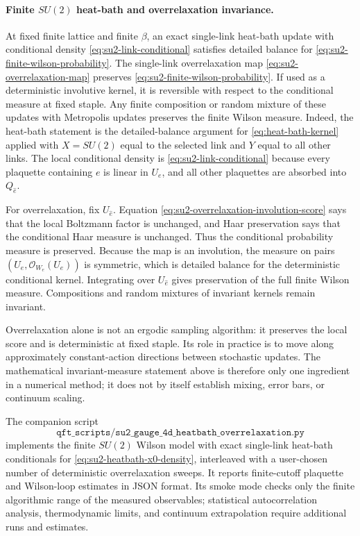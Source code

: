 \paragraph{Finite \(SU(2)\) heat-bath and overrelaxation invariance.}
At fixed finite lattice and finite \(\beta\), an exact single-link heat-bath
update with conditional density \eqref{eq:su2-link-conditional} satisfies
detailed balance for \eqref{eq:su2-finite-wilson-probability}.  The
single-link overrelaxation map \eqref{eq:su2-overrelaxation-map} preserves
\eqref{eq:su2-finite-wilson-probability}.  If used as a deterministic
involutive kernel, it is reversible with respect to the conditional measure
at fixed staple.  Any finite composition or random mixture of these updates
with Metropolis updates preserves the finite Wilson measure.  Indeed, the
heat-bath statement is the detailed-balance argument for
\eqref{eq:heat-bath-kernel} applied with \(X=SU(2)\) equal to the selected
link and \(Y\) equal to all other links.  The local
conditional density is \eqref{eq:su2-link-conditional} because every
plaquette containing \(e\) is linear in \(U_e\), and all other plaquettes are
absorbed into \(Q_{\widehat e}\).

For overrelaxation, fix \(U_{\widehat e}\).  Equation
\eqref{eq:su2-overrelaxation-involution-score} says that the local Boltzmann
factor is unchanged, and Haar preservation says that the conditional Haar
measure is unchanged.  Thus the conditional probability measure is preserved.
Because the map is an involution, the measure on pairs
\((U_e,\mathcal O_{W_e}(U_e))\) is symmetric, which is detailed balance for
the deterministic conditional kernel.  Integrating over \(U_{\widehat e}\)
gives preservation of the full finite Wilson measure.  Compositions and
random mixtures of invariant kernels remain invariant.

Overrelaxation alone is not an ergodic sampling algorithm: it preserves the
local score and is deterministic at fixed staple.  Its role in practice is to
move along approximately constant-action directions between stochastic
updates.  The mathematical invariant-measure statement above is therefore
only one ingredient in a numerical method; it does not by itself establish
mixing, error bars, or continuum scaling.

The companion script
\[
  \texttt{qft\_scripts/su2\_gauge\_4d\_heatbath\_overrelaxation.py}
\]
implements the finite \(SU(2)\) Wilson model with exact single-link
heat-bath conditionals for \eqref{eq:su2-heatbath-x0-density}, interleaved
with a user-chosen number of deterministic overrelaxation sweeps.  It reports
finite-cutoff plaquette and Wilson-loop estimates in JSON format.  Its smoke
mode checks only the finite algorithmic range of the measured observables;
statistical autocorrelation analysis, thermodynamic limits, and continuum
extrapolation require additional runs and estimates.

